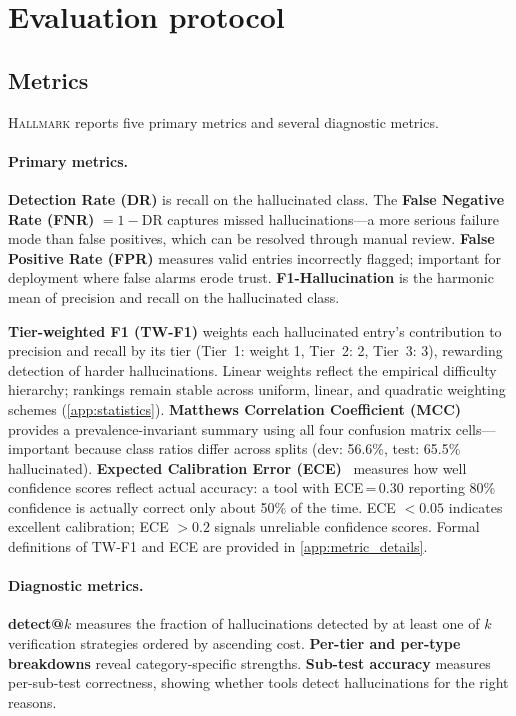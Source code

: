\section{Evaluation protocol}
\label{sec:evaluation}

\subsection{Metrics}
\label{sec:metrics}

\textsc{Hallmark} reports five primary metrics and several diagnostic metrics.

\paragraph{Primary metrics.}
\textbf{Detection Rate (DR)} is recall on the hallucinated class.
The \textbf{False Negative Rate (FNR)} $= 1 - \text{DR}$ captures missed hallucinations---a more serious failure mode than false positives, which can be resolved through manual review.
\textbf{False Positive Rate (FPR)} measures valid entries incorrectly flagged; important for deployment where false alarms erode trust.
\textbf{F1-Hallucination} is the harmonic mean of precision and recall on the hallucinated class.

\textbf{Tier-weighted F1 (TW-F1)} weights each hallucinated entry's contribution to precision and recall by its tier (Tier~1: weight 1, Tier~2: 2, Tier~3: 3), rewarding detection of harder hallucinations.
Linear weights reflect the empirical difficulty hierarchy; rankings remain stable across uniform, linear, and quadratic weighting schemes (\cref{app:statistics}).
\textbf{Matthews Correlation Coefficient (MCC)}~\citep{matthews1975} provides a prevalence-invariant summary using all four confusion matrix cells---important because class ratios differ across splits (dev: 56.6\%, test: 65.5\% hallucinated).
\textbf{Expected Calibration Error (ECE)}~\citep{naeini2015} measures how well confidence scores reflect actual accuracy: a tool with ECE\,=\,0.30 reporting 80\% confidence is actually correct only about 50\% of the time.
ECE $< 0.05$ indicates excellent calibration; ECE $> 0.2$ signals unreliable confidence scores.
Formal definitions of TW-F1 and ECE are provided in \cref{app:metric_details}.

\paragraph{Diagnostic metrics.}
\textbf{detect@$k$} measures the fraction of hallucinations detected by at least one of $k$ verification strategies ordered by ascending cost.
\textbf{Per-tier and per-type breakdowns} reveal category-specific strengths.
\textbf{Sub-test accuracy} measures per-sub-test correctness, showing whether tools detect hallucinations for the right reasons.

